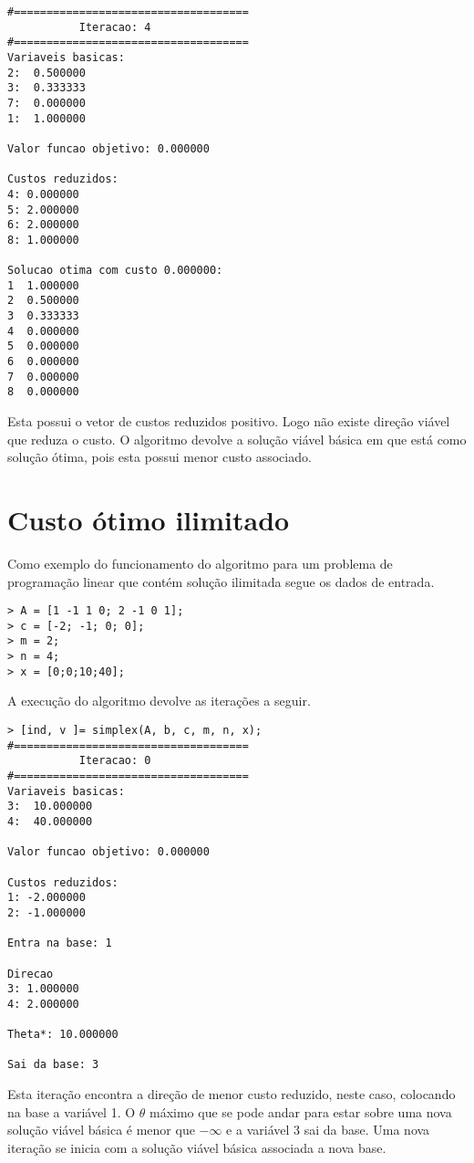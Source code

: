 \documentclass[
	12pt,				%
	openright,			%
	oneside,			%
	a4paper,			%
	english,			%
	french,				%
	spanish,			%
	brazil,				%
	]{abntex2}
\begin{document}
\begin{verbatim}
#====================================
           Iteracao: 4
#====================================
Variaveis basicas:
2:  0.500000
3:  0.333333
7:  0.000000
1:  1.000000

Valor funcao objetivo: 0.000000

Custos reduzidos:
4: 0.000000
5: 2.000000
6: 2.000000
8: 1.000000

Solucao otima com custo 0.000000:
1  1.000000
2  0.500000
3  0.333333
4  0.000000
5  0.000000
6  0.000000
7  0.000000
8  0.000000
\end{verbatim}

Esta possui o vetor de custos reduzidos positivo. Logo não existe direção viável que reduza o custo. O algoritmo devolve a solução viável básica em que está como solução ótima, pois esta possui menor custo associado.  
  
  
\section{Custo ótimo ilimitado}
Como exemplo do funcionamento do algoritmo para um problema de programação linear que contém solução ilimitada segue os dados de entrada.

\begin{verbatim}
> A = [1 -1 1 0; 2 -1 0 1];
> c = [-2; -1; 0; 0];
> m = 2;
> n = 4;
> x = [0;0;10;40];
\end{verbatim}

A execução do algoritmo devolve as iterações a seguir. 

\begin{verbatim}
> [ind, v ]= simplex(A, b, c, m, n, x);
#====================================
           Iteracao: 0
#====================================
Variaveis basicas:
3:  10.000000
4:  40.000000

Valor funcao objetivo: 0.000000

Custos reduzidos:
1: -2.000000
2: -1.000000

Entra na base: 1

Direcao
3: 1.000000
4: 2.000000

Theta*: 10.000000

Sai da base: 3
\end{verbatim}

Esta iteração encontra a direção de menor custo reduzido, neste caso, colocando na base a variável 1. O $\theta$ máximo que se pode andar para estar sobre uma nova solução viável básica é menor que $-\infty$ e a variável 3 sai da base.
Uma nova iteração se inicia com a solução viável básica associada a nova base.
\end{document}
